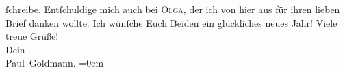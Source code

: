\begin{ledgroupsized}[t]{13cm}
               ſchreibe. Entſchuldige mich auch bei \textsc{Olga}, der ich von hier aus für
               ihren lieben Brief danken wollte.\pend
           \pstart
           Ich wünſche Euch Beiden ein
               glückliches neues Jahr!\pend
           \pstart
           Viele treue Grüße! {\\[\baselineskip]}Dein {\\[\baselineskip]}\spacefill\mbox{Paul Goldmann.}\pend
           \leftskip=0em{}
         
         \endnumbering{}\end{ledgroupsized}  \newcommand{\dateiname}{L03231}\newcommand{\titel}{Paul Goldmann an Arthur Schnitzler, 28. 12. [1902]}\newcommand{\editorInnen}{Martin Anton Müller und Laura Untner}
      
